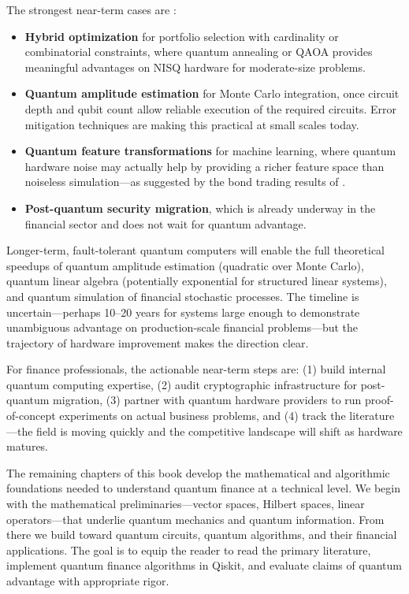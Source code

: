 The strongest near-term cases are \citep{gong_quantum_2026-1,herman_quantum_2023,egger_quantum_2020}:

\begin{itemize}
\item \textbf{Hybrid optimization} for portfolio selection with cardinality or combinatorial constraints, where quantum annealing or QAOA provides meaningful advantages on NISQ hardware for moderate-size problems.
\item \textbf{Quantum amplitude estimation} for Monte Carlo integration, once circuit depth and qubit count allow reliable execution of the required circuits. Error mitigation techniques are making this practical at small scales today.
\item \textbf{Quantum feature transformations} for machine learning, where quantum hardware noise may actually help by providing a richer feature space than noiseless simulation---as suggested by the bond trading results of \citet{ciceri_enhanced_2025}.
\item \textbf{Post-quantum security migration}, which is already underway in the financial sector and does not wait for quantum advantage.
\end{itemize}

Longer-term, fault-tolerant quantum computers will enable the full theoretical speedups of quantum amplitude estimation (quadratic over Monte Carlo), quantum linear algebra (potentially exponential for structured linear systems), and quantum simulation of financial stochastic processes. The timeline is uncertain---perhaps 10--20 years for systems large enough to demonstrate unambiguous advantage on production-scale financial problems---but the trajectory of hardware improvement makes the direction clear.

\begin{remark}
For finance professionals, the actionable near-term steps are: (1) build internal quantum computing expertise, (2) audit cryptographic infrastructure for post-quantum migration, (3) partner with quantum hardware providers to run proof-of-concept experiments on actual business problems, and (4) track the literature---the field is moving quickly and the competitive landscape will shift as hardware matures.
\end{remark}

The remaining chapters of this book develop the mathematical and algorithmic foundations needed to understand quantum finance at a technical level. We begin with the mathematical preliminaries---vector spaces, Hilbert spaces, linear operators---that underlie quantum mechanics and quantum information. From there we build toward quantum circuits, quantum algorithms, and their financial applications. The goal is to equip the reader to read the primary literature, implement quantum finance algorithms in Qiskit, and evaluate claims of quantum advantage with appropriate rigor.

\textsep

